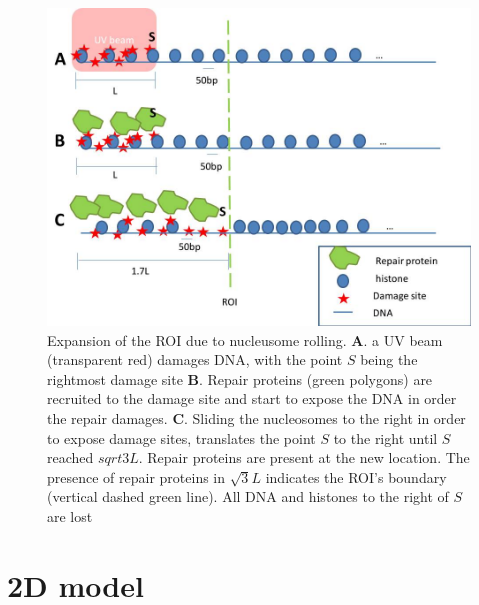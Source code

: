 \documentclass[12pt]{paper}
\begin{document}
	\begin{figure}
	\centering
	\includegraphics[width=0.7\linewidth]{histoneSlidingMulti}
	\caption{Expansion of the ROI due to nucleusome rolling. \textbf{A}. a UV beam (transparent red) damages DNA, with the point $S$ being the rightmost damage site \textbf{B}. Repair proteins (green polygons) are recruited to the damage site and start to expose the DNA in order the repair damages. \textbf{C}. Sliding the nucleosomes to the right in order to expose damage sites, translates the point $S$ to the right until $S$ reached $sqrt{3}L$. Repair proteins are present at the new location. The presence of repair proteins in $\sqrt{3}L$ indicates the ROI's boundary (vertical dashed green line). All DNA and histones to the right of $S$ are lost}
	\label{fig:histoneSlidingMulti}
	\end{figure}
	
	\section{2D model}
	
	
\end{document}
